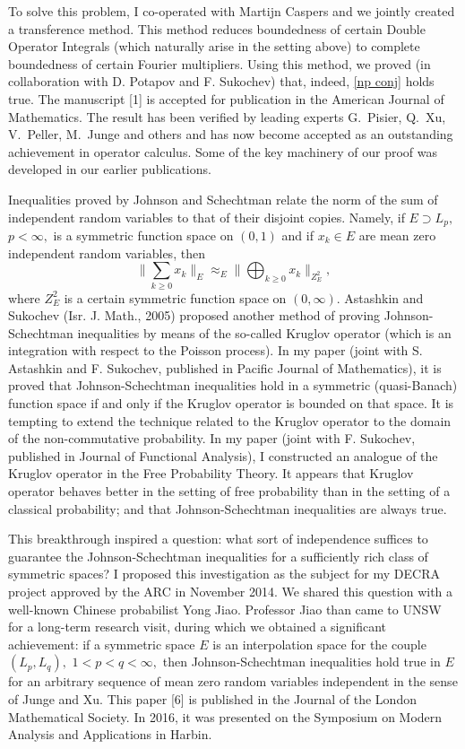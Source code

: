 \documentclass[12pt]{article}
\begin{document}
To solve this problem, I co-operated with Martijn Caspers and we jointly created a transference method. This method reduces boundedness of certain Double Operator Integrals (which naturally arise in the setting above) to complete boundedness of certain Fourier multipliers. Using this method, we proved (in collaboration with D. Potapov and F. Sukochev) that, indeed, \eqref{np conj} holds true. The manuscript [1] is accepted for publication in the American Journal of Mathematics. The result has been verified by leading experts G.~Pisier, Q.~Xu, V.~Peller, M.~Junge and others and has now become accepted as an outstanding achievement in operator calculus. Some of the key machinery of our proof was developed in our earlier publications.

Inequalities proved by Johnson and Schechtman relate the norm of the sum of independent random variables to that of their disjoint copies. Namely, if $E\supset L_p,$ $p<\infty,$ is a symmetric function space on $(0,1)$ and if $x_k\in E$ are mean zero independent random variables, then
$$\|\sum_{k\geq0}x_k\|_E\approx_E\|\bigoplus_{k\geq0}x_k\|_{Z_E^2},$$
where $Z_E^2$ is a certain symmetric function space on $(0,\infty).$ Astashkin and Sukochev (Isr. J. Math., 2005) proposed another method of proving Johnson-Schechtman inequalities by means of the so-called Kruglov operator (which is an integration with respect to the Poisson process). In my paper (joint with S. Astashkin and F. Sukochev, published in Pacific Journal of Mathematics), it is proved that Johnson-Schechtman inequalities hold in a symmetric (quasi-Banach) function space if and only if the Kruglov operator is bounded on that space. It is tempting to extend the technique related to the Kruglov operator to the domain of the non-commutative probability. In my paper (joint with F. Sukochev, published in Journal of Functional Analysis), I constructed an analogue of the Kruglov operator in the Free Probability Theory. It appears that Kruglov operator behaves better in the setting of free probability than in the setting of a classical probability; and that Johnson-Schechtman inequalities are always true.

This breakthrough inspired a question: what sort of independence suffices to guarantee the Johnson-Schechtman inequalities for a sufficiently rich class of symmetric spaces?  I proposed this investigation as the subject for my DECRA project approved by the ARC in November 2014. We shared this question with a well-known Chinese probabilist Yong Jiao. Professor Jiao than came to UNSW for a long-term research visit, during which we obtained a significant achievement: if a symmetric space $E$ is an interpolation space for the couple $(L_p,L_q),$ $1<p<q<\infty,$ then Johnson-Schechtman inequalities hold true in $E$ for an arbitrary sequence of mean zero random variables independent in the sense of Junge and Xu. This paper [6] is published in the Journal of the London Mathematical Society. In 2016, it was presented on the Symposium on Modern Analysis and Applications in Harbin.
\end{document}
